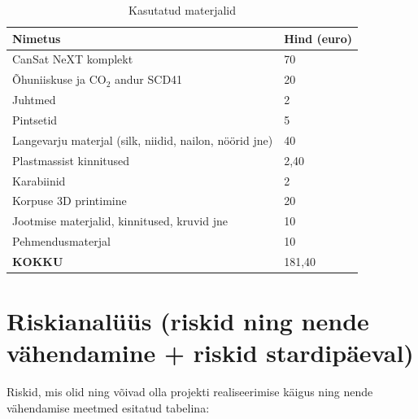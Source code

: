 \begin{table}[H]
    \centering
    \noindent\setlength\tabcolsep{4pt}%
    \begin{tabularx}{\linewidth}{|>{\RaggedRight\arraybackslash}X|l|}
        \hline
        \textbf{Nimetus} & \textbf{Hind (euro)}\\
        \hline
        \hline
        CanSat NeXT komplekt & 70\\
        \hline
        Õhuniiskuse ja CO$_2$ andur SCD41& 20\\
        \hline
        Juhtmed & 2\\
        \hline
        Pintsetid & 5\\
        \hline
        Langevarju materjal (silk, niidid, nailon, nöörid jne) & 40\\
        \hline
        Plastmassist kinnitused & 2,40\\
        \hline
        Karabiinid & 2\\
        \hline
        Korpuse 3D printimine & 20\\
        \hline
        Jootmise materjalid, kinnitused, kruvid jne & 10\\
        \hline
        Pehmendusmaterjal & 10\\
        \hline
        \textbf{KOKKU} & 181,40\\
        \hline
    \end{tabularx}
    \caption{Kasutatud materjalid}
    \label{tab:3}
\end{table}

\section{Riskianalüüs (riskid ning nende vähendamine + riskid stardipäeval)}

Riskid, mis olid ning võivad olla projekti realiseerimise käigus ning nende vähendamise meetmed esitatud tabelina:

